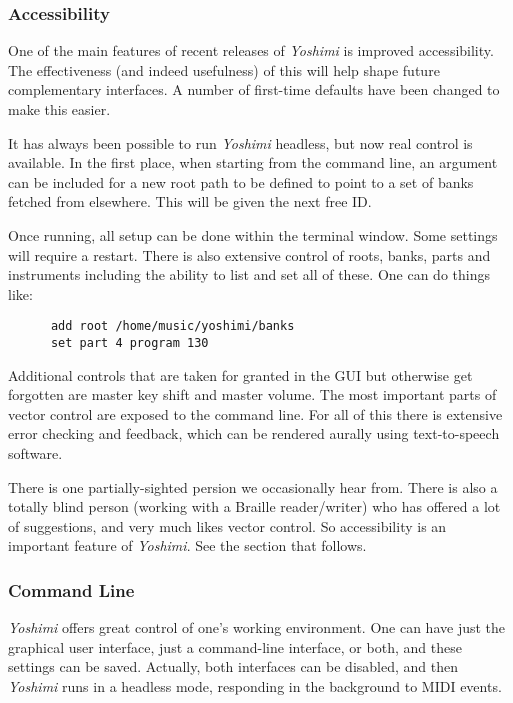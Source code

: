 \documentclass[
 11pt,
 twoside,
 a4paper,
 final                                 %
]{article}
\begin{document}
\subsubsection{Accessibility}
\label{subsubsec:new_features_accessibility}

   One of the main features of recent releases of \textsl{Yoshimi} is improved
   accessibility. The effectiveness (and indeed usefulness) of this will help
   shape future complementary interfaces. A number of first-time defaults
   have been changed to make this easier.

   It has always been possible to run \textsl{Yoshimi} headless, but now real
   control is available. In the first place, when starting from the command
   line, an argument can be included for a new root path to be defined to point
   to a set of banks fetched from elsewhere. This will be given the next free
   ID.

   Once running, all setup can be done within the terminal window.
   Some settings will require a restart.
   There is also extensive control of
   roots, banks, parts and instruments including the ability to list and set
   all of these. One can do things like:

   \begin{verbatim}
      add root /home/music/yoshimi/banks
      set part 4 program 130
   \end{verbatim}

   Additional controls that are taken for granted in the GUI but
   otherwise get forgotten are master key shift and master volume.  The
   most important parts of vector control are exposed to the command line.
   For all of this there is extensive error checking and feedback, which can be
   rendered aurally using text-to-speech software.

   There is one partially-sighted persion we occasionally hear from. There
   is also a totally blind person (working with a Braille reader/writer) who has
   offered a lot of suggestions, and very much likes vector control.  So
   accessibility  is an important feature of
   \textsl{Yoshimi}.  See the section that follows.
   
\subsubsection{Command Line}
\label{subsubsec:new_features_command_line}

   \textsl{Yoshimi} offers great control of one's working environment.
   One can have just the graphical user interface, just a command-line
   interface, or both, and these settings can be saved.  Actually, both
   interfaces can be disabled, and then \textsl{Yoshimi} runs in a headless
   mode, responding in the background to MIDI events.
   
\end{document}
